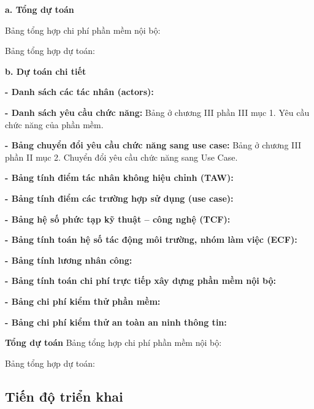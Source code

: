 \textbf{a. Tổng dự toán}

Bảng tổng hợp chi phí phần mềm nội bộ:


Bảng tổng hợp dự toán:


\cleardoublepage
\textbf{b. Dự toán chi tiết}

\vspace{0.3cm}
\textbf{- Danh sách các tác nhân (actors):}


\textbf{- Danh sách yêu cầu chức năng:} Bảng ở chương III phần III mục 1. Yêu cầu chức năng của phần mềm.

\vspace{0.3cm}
\textbf{- Bảng chuyển đổi yêu cầu chức năng sang use case:} Bảng ở chương III phần II mục 2. Chuyển đổi yêu cầu chức năng sang Use Case.

\vspace{0.3cm}
\textbf{- Bảng tính điểm tác nhân không hiệu chỉnh (TAW):}

\cleardoublepage
\textbf{- Bảng tính điểm các trường hợp sử dụng (use case):}

\cleardoublepage
\textbf{- Bảng hệ số phức tạp kỹ thuật – công nghệ (TCF):}

\cleardoublepage

\textbf{- Bảng tính toán hệ số tác động môi trường, nhóm làm việc (ECF):}

\cleardoublepage

\textbf{- Bảng tính lương nhân công:}

\cleardoublepage

\textbf{- Bảng tính toán chi phí trực tiếp xây dựng phần mềm nội bộ:}

\cleardoublepage

\textbf{- Bảng chi phí kiểm thử phần mềm:}

\vspace{0.3cm}

\textbf{- Bảng chi phí kiểm thử an toàn an ninh thông tin:}

\cleardoublepage
\textbf{Tổng dự toán}
Bảng tổng hợp chi phí phần mềm nội bộ:


Bảng tổng hợp dự toán:


\cleardoublepage
\subsection{Tiến độ triển khai}


